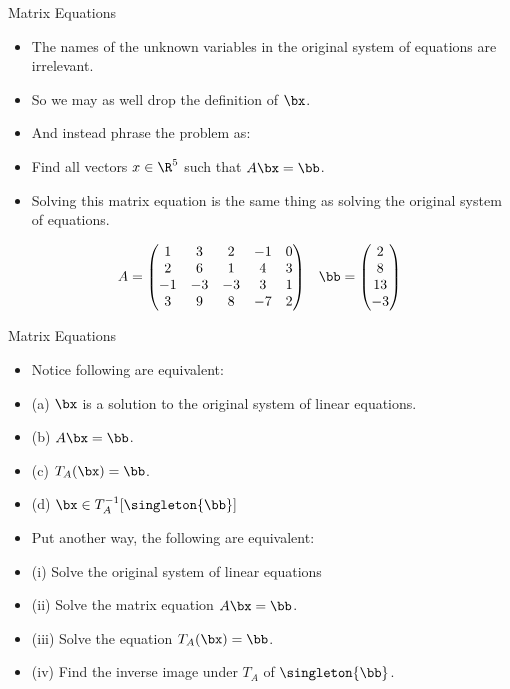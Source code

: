 \documentclass{beamer}
\begin{document}


\begin{frame}{Matrix Equations}

\begin{itemize}
\item The names of the unknown variables in the original system of equations
are irrelevant.
\item So we may as well drop the definition of $\bx$.
\item And instead phrase the problem as:
\item Find all vectors $x \in \R^5$ such that $A \bx = \bb$.
\item Solving this matrix equation is the same thing as solving the
original system of equations.

\end{itemize}

$$
\begin{matrix}
A =
\begin{pmatrix}
1 & 3 & 2 & -1 & 0 \\
2 & 6 & 1 & 4 & 3\\
-1 & -3 & -3 & 3 & 1 \\
3 & 9 & 8 & -7 & 2
\end{pmatrix}
&
\bb =
\begin{pmatrix}
2 \\ 8 \\ 13 \\ -3
\end{pmatrix}
\end{matrix}
$$

\end{frame}



\begin{frame}{Matrix Equations}

\begin{itemize}
\item Notice following are equivalent:
\item (a) $\bx$ is a solution to the original system of linear equations.
\item (b) $A \bx = \bb$.
\item (c) $T_A(\bx) = \bb$.
\item (d) $\bx \in T_A^{-1}[\singleton{\bb}]$
\item Put another way, the following are equivalent:
\item (i) Solve the original system of linear equations
\item (ii) Solve the matrix equation $A \bx = \bb$.
\item (iii) Solve the equation $T_A(\bx) = \bb$.
\item (iv) Find the inverse image under $T_A$ of $\singleton{\bb}$.
\end{itemize}

\end{frame}
\end{document}
